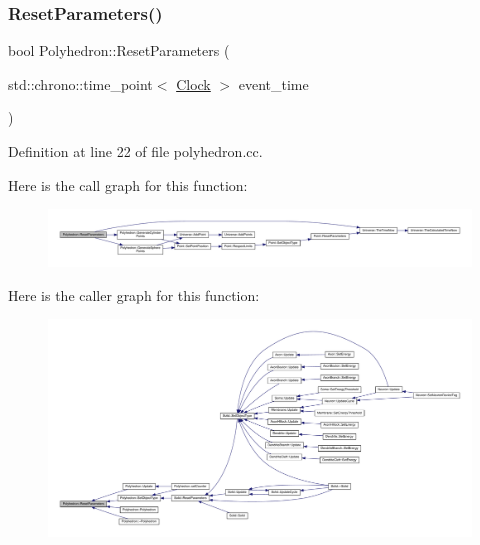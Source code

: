 \subsubsection{\texorpdfstring{Reset\+Parameters()}{ResetParameters()}}
{\footnotesize\ttfamily bool Polyhedron\+::\+Reset\+Parameters (\begin{DoxyParamCaption}\item[{std\+::chrono\+::time\+\_\+point$<$ \hyperlink{universe_8h_a0ef8d951d1ca5ab3cfaf7ab4c7a6fd80}{Clock} $>$}]{event\+\_\+time }\end{DoxyParamCaption})}



Definition at line 22 of file polyhedron.\+cc.

Here is the call graph for this function\+:
\nopagebreak
\begin{figure}[H]
\begin{center}
\leavevmode
\includegraphics[width=350pt]{class_polyhedron_ae90c347cfb8ca8028a260e88bef2b45c_cgraph}
\end{center}
\end{figure}
Here is the caller graph for this function\+:
\nopagebreak
\begin{figure}[H]
\begin{center}
\leavevmode
\includegraphics[width=350pt]{class_polyhedron_ae90c347cfb8ca8028a260e88bef2b45c_icgraph}
\end{center}
\end{figure}
\mbox{\label{class_polyhedron_ad74a1ccc28a08bc2dbc186e5f2c1f694}} 
